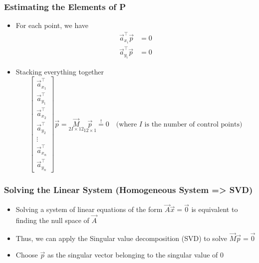 \begin{frame}
\begin{center}
  \end{center}

\end{frame}


\begin{frame}
  \frametitle{Estimating the Elements of P}

  \begin{itemize}
    \item For each point, we have
    \begin{align*}
        \vec{a}_{x_i}^{\top} \vec{p} &= 0 \\
        \vec{a}_{y_i}^{\top} \vec{p} &= 0
    \end{align*}
    \item Stacking everything together
    \begin{equation*}
      \begin{bmatrix}
        \vec{a}_{x_1}^{\top} \\
        \vec{a}_{y_1}^{\top} \\
        \vec{a}_{x_2}^{\top} \\
        \vec{a}_{y_2}^{\top} \\
        \vdots \\
        \vec{a}_{x_n}^{\top} \\
        \vec{a}_{y_n}^{\top}
      \end{bmatrix} \vec{p} = \underset{2I\times 12}{\vec{M}} \underset{12\times1}{\vec{p}} \stackrel{!}{=} 0 \quad \text{(where $I$ is the number of control points)}
    \end{equation*}
  \end{itemize}

\end{frame}


\begin{frame}
  \frametitle{Solving the Linear System (Homogeneous System => SVD)}
  \begin{itemize}
    \item Solving a system of linear equations of the form $\vec{A}\vec{x} = \vec{0}$ is equivalent to finding the null space of $\vec{A}$
    \item Thus, we can apply the Singular value decomposition (SVD) to solve $\vec{M}\vec{p} = \vec{0}$
    \item Choose $\vec{p}$ as the singular vector belonging to the singular value of 0
  \end{itemize}
\end{frame}

